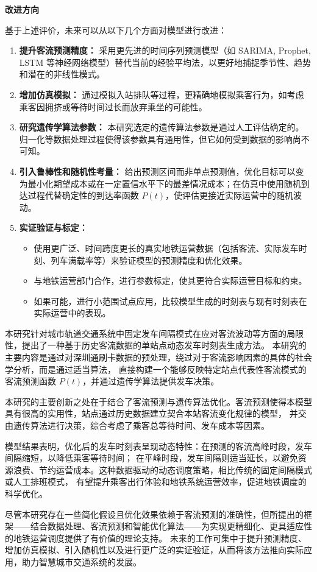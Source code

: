 \textbf{改进方向}

基于上述评价，未来可以从以下几个方面对模型进行改进：
\begin{enumerate}
    \item \textbf{提升客流预测精度：} 采用更先进的时间序列预测模型（如 SARIMA, Prophet, LSTM 等神经网络模型）替代当前的经验平均法，以更好地捕捉季节性、趋势和潜在的非线性模式。
    \item \textbf{增加仿真模拟：} 通过模拟入站排队等过程，更精确地模拟乘客行为，如考虑乘客因拥挤或等待时间过长而放弃乘坐的可能性。
    \item \textbf{研究遗传学算法参数：} 本研究选定的遗传算法参数是通过人工评估确定的。归一化等数据处理过程使得该参数具有通用性，但它如何受到数据的影响尚不可知。
    \item \textbf{引入鲁棒性和随机性考量：} 给出预测区间而非单点预测值，优化目标可以变为最小化期望成本或在一定置信水平下的最差情况成本；在仿真中使用随机到达过程代替确定性的到达率函数 $P(t)$，使评估更接近实际运营中的随机波动。
    \item \textbf{实证验证与标定：}
        \begin{itemize}
            \item 使用更广泛、时间跨度更长的真实地铁运营数据（包括客流、实际发车时刻、列车满载率等）来验证模型的预测精度和优化效果。
            \item 与地铁运营部门合作，进行参数标定，使其更符合实际运营目标和约束。
            \item 如果可能，进行小范围试点应用，比较模型生成的时刻表与现有时刻表在实际运营中的表现。
        \end{itemize}
\end{enumerate}


本研究针对城市轨道交通系统中固定发车间隔模式在应对客流波动等方面的局限性，提出了一种基于历史客流数据的单站点动态发车时刻表生成方法。
本研究的主要内容是通过对深圳通刷卡数据的预处理，绕过对于客流影响因素的具体的社会学分析，而是通过适当算法，
直接构建一个能够反映特定站点代表性客流模式的客流预测函数 $P(t)$，并通过遗传学算法提供发车决策。

本研究的主要创新之处在于结合了客流预测与遗传算法优化。客流预测使得本模型具有很高的实用性，站点通过历史数据建立契合本站客流变化规律的模型，
并交由遗传算法进行决策，综合考虑了乘客总等待时间、发车成本等因素。

模型结果表明，优化后的发车时刻表呈现动态特性：在预测的客流高峰时段，发车间隔缩短，以降低乘客等待时间；
在平峰时段，发车间隔则适当延长，以避免资源浪费、节约运营成本。这种数据驱动的动态调度策略，相比传统的固定间隔模式或人工排班模式，
有望提升乘客出行体验和地铁系统运营效率，促进地铁调度的科学优化。

尽管本研究存在一些简化假设且优化效果依赖于客流预测的准确性，但所提出的框架——结合数据处理、客流预测和智能优化算法——为实现更精细化、更具适应性的地铁运营调度提供了有价值的理论支持。
未来的工作可集中于提升预测精度、增加仿真模拟、引入随机性以及进行更广泛的实证验证，从而将该方法推向实际应用，助力智慧城市交通系统的发展。